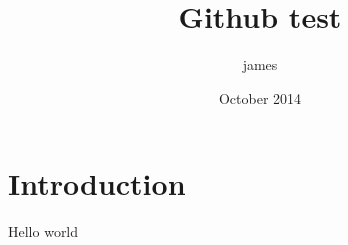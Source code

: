 \documentclass{article}
\title{Github test}
\author{james }
\date{October 2014}
\begin{document}
\maketitle

\section{Introduction}

Hello world
\end{document}
